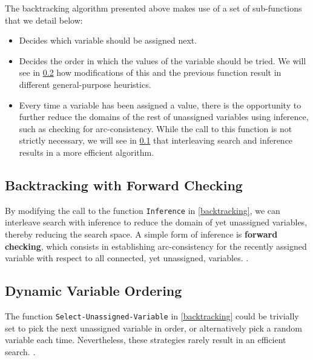 The backtracking algorithm presented above makes use of a set of sub-functions that we detail below:
\begin{itemize}
	\item \begin{algorithmic}\end{algorithmic}
	Decides which variable should be assigned next.
	\item \begin{algorithmic}\end{algorithmic}
	Decides the order in which the values of the variable should be tried. We will see in \cref{dynamic_variable_ordering} how modifications of this and the previous function result in different general-purpose heuristics.
	\item \begin{algorithmic}\end{algorithmic}
	Every time a variable has been assigned a value, there is the opportunity to further reduce the domains of the rest of unassigned variables using inference, such as checking for arc-consistency. While the call to this function is not strictly necessary, we will see in \cref{bt_with_forward_checking} that interleaving search and inference results in a more efficient algorithm.
\end{itemize}

\subsection{Backtracking with Forward Checking}
\label{bt_with_forward_checking}
By modifying the call to the function \texttt{Inference} in \cref{backtracking}, we can interleave search with inference to reduce the domain of yet unassigned variables, thereby reducing the search space.
A simple form of inference is \textbf{forward checking}, which consists in establishing arc-consistency for the recently assigned variable with respect to all connected, yet unassigned, variables.
.


\subsection{Dynamic Variable Ordering}
\label{dynamic_variable_ordering}
The function \texttt{Select-Unassigned-Variable} in \cref{backtracking} could be trivially set to pick the next unassigned variable in order, or alternatively pick a random variable each time.
Nevertheless, these strategies rarely result in an efficient search.
.


